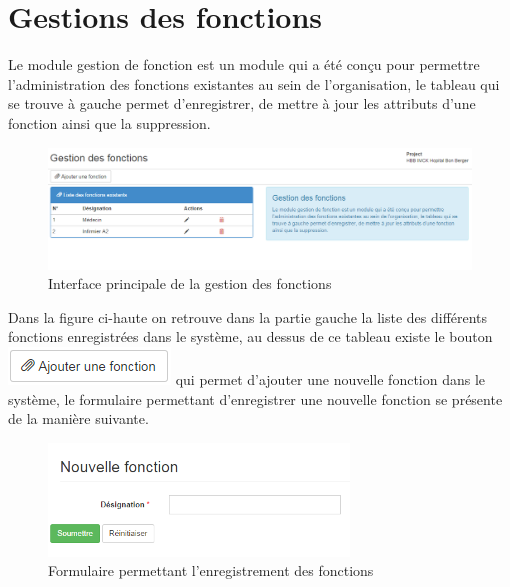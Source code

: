 \documentclass[12pt,a4paper]{report}
\begin{document}
\section{Gestions des fonctions}
Le module gestion de fonction est un module qui a été conçu pour permettre l'administration des fonctions existantes au sein de l'organisation, le tableau qui se trouve à gauche permet d’enregistrer, de mettre à jour les attributs d'une fonction ainsi que la suppression.
\begin{figure}[h]
\begin{center}
\includegraphics[width=14cm]{pic/GestionFonction.png}
\end{center}
\caption{Interface principale de la gestion des fonctions}
\label{Interface principale de la gestion des fonctions}
\end{figure}

Dans la figure ci-haute on retrouve dans la partie gauche la liste des différents fonctions enregistrées dans le système, au dessus de ce tableau existe le bouton \includegraphics[scale=1]{pic/AddFonction.png} qui permet d'ajouter une nouvelle fonction dans le système, le formulaire permettant d'enregistrer une nouvelle fonction se présente de la manière suivante.

\begin{figure}[h]
\begin{center}
\includegraphics[width=8cm]{pic/FormAddFonction.png}
\end{center}
\caption{Formulaire permettant l'enregistrement des fonctions}
\label{Formulaire permettant l'enregistrement des fonctions}
\end{figure} 
\end{document}
